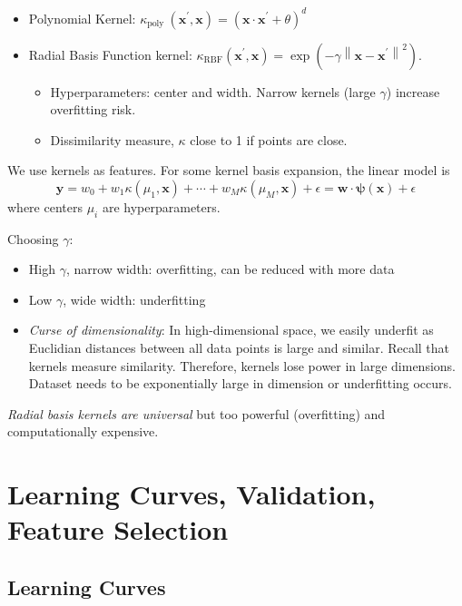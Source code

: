 \documentclass[11pt, %
	oneside, %
	english, %
	onehalfspacing, %
	parskip, %
	]{article} %
\theoremstyle{definition}
\begin{document}
\begin{itemize}
	\item Polynomial Kernel: $\kappa_{\text {poly }}\left(\mathbf{x}^{\prime}, \mathbf{x}\right)=\left(\mathbf{x} \cdot \mathbf{x}^{\prime}+\theta\right)^d$
	\item Radial Basis Function kernel: $\kappa_{\mathrm{RBF}}\left(\mathbf{x}^{\prime}, \mathbf{x}\right)=\exp \left(-\gamma\left\|\mathbf{x}-\mathbf{x}^{\prime}\right\|^2\right)$.
	\begin{itemize}
		\item Hyperparameters: center and width. Narrow kernels (large $\gamma$) increase overfitting risk.
		\item Dissimilarity measure, $\kappa$ close to 1 if points are close.
	\end{itemize}
\end{itemize}

We use kernels as features. For some kernel basis expansion, the linear model is
\begin{equation*}
	\boldsymbol{y}=w_0+w_1 \kappa\left(\mu_1, \mathbf{x}\right)+\cdots+w_M \kappa\left(\mu_M, \mathbf{x}\right)+\epsilon=\mathbf{w} \cdot \boldsymbol{\psi}(\mathbf{x})+\epsilon
\end{equation*}
where centers $\mu_i$ are hyperparameters.

Choosing $\gamma$:
\begin{itemize}
	\item High $\gamma$, narrow width: overfitting, can be reduced with more data
	\item Low $\gamma$, wide width: underfitting
	\item \emph{Curse of dimensionality}: In  high-dimensional space, we easily underfit as Euclidian distances between all data points is large and similar. Recall that kernels measure similarity. Therefore, kernels lose power in large dimensions. Dataset needs to be exponentially large in dimension or underfitting occurs.
\end{itemize}

\emph{Radial basis kernels are universal} but too powerful (overfitting) and computationally expensive.


\section{Learning Curves, Validation, Feature Selection}

\subsection{Learning Curves}
\end{document}
